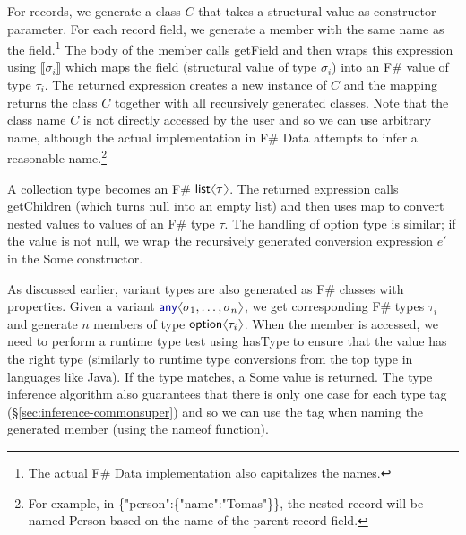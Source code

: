 \documentclass[10pt,preprint,blind,clearpagebib]{sigplanconf}
\newcommand{\langl}{\begin{picture}(4.5,7)
\put(1.1,2.5){\rotatebox{60}{\line(1,0){5.5}}}
\put(1.1,2.5){\rotatebox{300}{\line(1,0){5.5}}}
\end{picture}}
\newcommand{\rangl}{\begin{picture}(4.5,7)
\put(.9,2.5){\rotatebox{120}{\line(1,0){5.5}}}
\put(.9,2.5){\rotatebox{240}{\line(1,0){5.5}}}
\end{picture}}
\newcommand{\kvd}[1]{\textnormal{\textcolor{kvdclr}{\sffamily #1}}}
\newcommand{\str}[1]{\textnormal{\textcolor{strclr}{\sffamily "#1"}}}
\newcommand{\ident}[1]{\textnormal{\sffamily #1}}
\newcommand{\sem}[1]{\llbracket #1 \rrbracket}
\begin{document}
For records, we generate a class $C$ that takes a structural value as constructor
parameter. For each record field, we generate a member with the same name as the field.\footnote{The actual
F\# Data implementation also capitalizes the names.} The body of the member calls \ident{getField} and then
wraps this expression using $\sem{\sigma_i}$ which maps the field (structural value of type $\sigma_i$) into 
an F\# value of type $\tau_i$. The returned expression creates a new instance of $C$ and the mapping returns 
the class $C$ together with all recursively generated classes. Note that the class
name $C$ is not directly accessed by the user and so we can use arbitrary name, although the actual 
implementation in F\# Data attempts to infer a reasonable name.\footnote{For example, in 
\ident{\{\str{person}:\{\str{name}:\str{Tomas}\}\}}, the nested record will be named \ident{Person}
based on the name of the parent record field.}

A collection type becomes an F\# $\ident{list}\langl\tau\rangl$. The returned expression calls \ident{getChildren}
(which turns \kvd{null} into an empty list) and then uses \ident{map} to convert nested values to 
values of an F\# type $\tau$. The handling of option type is similar; if the value is not \kvd{null},
we wrap the recursively generated conversion expression $e'$ in the \ident{Some} constructor.

As discussed earlier, variant types are also generated as F\# classes with properties. Given a variant
$\kvd{any}\langl\sigma_1, \ldots, \sigma_n\rangl$, we get corresponding F\# types $\tau_i$ and generate 
$n$ members of type $\ident{option}\langl \tau_i\rangl$. When the member is accessed, we need to perform
a runtime type test using \ident{hasType} to ensure that the value has the right type (similarly to runtime 
type conversions from the top type in languages like Java). If the type matches, a \ident{Some} value is 
returned. The type inference algorithm also guarantees that there is only one case for each type tag 
(\S\ref{sec:inference-commonsuper}) and so we can use the tag when naming the generated member 
(using the \ident{nameof} function).
\end{document}
